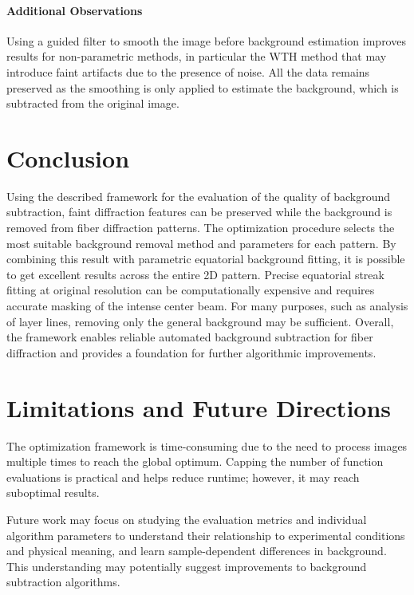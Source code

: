 \documentclass[iucr,review]{iucrjournals}
\begin{document}
\paragraph{Additional Observations}
Using a guided filter to smooth the image before background estimation improves results
for non-parametric methods, in particular the WTH method that may introduce faint artifacts
due to the presence of noise. All the data remains preserved as the smoothing
is only applied to estimate the background, which is subtracted from the original image.




\section{Conclusion}

Using the described framework for the evaluation of the quality of background subtraction,
faint diffraction features can be preserved while the background is removed
from fiber diffraction patterns.
The optimization procedure selects the most suitable
background removal method and parameters for each pattern.
By combining this result with
parametric equatorial background fitting, it is possible to get excellent results across the entire 2D
pattern. Precise equatorial streak fitting at original resolution
can be computationally expensive and requires accurate masking of the intense center beam.
For many purposes, such as analysis of layer lines, removing only the general background may be sufficient.
Overall, the framework enables reliable automated background subtraction for fiber diffraction
and provides a foundation for further algorithmic improvements.


\section{Limitations and Future Directions}

The optimization framework is time-consuming due to the need to process images multiple
times to reach the global optimum. Capping the number of function evaluations is practical and
helps reduce runtime; however, it may reach suboptimal results.

Future work may focus on studying the evaluation metrics and individual algorithm parameters 
to understand their relationship to experimental conditions and physical meaning, and learn sample-dependent
differences in background. This understanding may potentially suggest
improvements to background subtraction algorithms.
\end{document}
